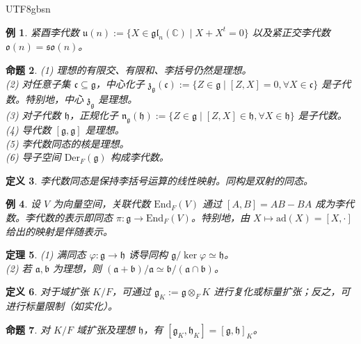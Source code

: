 \documentclass[11pt]{article}
\newtheorem{theorem}{定理}[section]
\newtheorem{proposition}[theorem]{命题}
\newtheorem{definition}[theorem]{定义}
\newtheorem{example}[theorem]{例}
\begin{document}
\begin{CJK*}{UTF8}{gbsn}
\begin{example}
紧酉李代数 $\mathfrak{u}(n) := \{X \in \mathfrak{gl}_n(\mathbb{C}) \mid X + X^t = 0\}$ 以及紧正交李代数 $\mathfrak{o}(n) = \mathfrak{so}(n)$。
\end{example}

\begin{proposition}
(1) 理想的有限交、有限和、李括号仍然是理想。\\
(2) 对任意子集 $\mathfrak{c} \subseteq \mathfrak{g}$，中心化子 $\mathfrak{z}_{\mathfrak{g}}(\mathfrak{c}) := \{Z \in \mathfrak{g} \mid [Z, X] = 0, \forall X \in \mathfrak{c}\}$ 是子代数。特别地，中心 $\mathfrak{z}_{\mathfrak{g}}$ 是理想。\\
(3) 对子代数 $\mathfrak{h}$，正规化子 $\mathfrak{n}_{\mathfrak{g}}(\mathfrak{h}) := \{Z \in \mathfrak{g} \mid [Z, X] \in \mathfrak{h}, \forall X \in \mathfrak{h}\}$ 是子代数。\\
(4) 导代数 $[\mathfrak{g}, \mathfrak{g}]$ 是理想。\\
(5) 李代数同态的核是理想。\\
(6) 导子空间 $\mathrm{Der}_F(\mathfrak{g})$ 构成李代数。
\end{proposition}

\begin{definition}
李代数同态是保持李括号运算的线性映射。同构是双射的同态。
\end{definition}

\begin{example}
设 $V$ 为向量空间，关联代数 $\mathrm{End}_F(V)$ 通过 $[A, B] = AB - BA$ 成为李代数。李代数的表示即同态 $\pi: \mathfrak{g} \to \mathrm{End}_F(V)$。特别地，由 $X \mapsto \mathrm{ad}(X) = [X, \cdot]$ 给出的映射是伴随表示。
\end{example}

\begin{theorem}
(1) 满同态 $\varphi: \mathfrak{g} \to \mathfrak{h}$ 诱导同构 $\mathfrak{g}/\ker \varphi \simeq \mathfrak{h}$。\\
(2) 若 $\mathfrak{a}, \mathfrak{b}$ 为理想，则 $(\mathfrak{a}+\mathfrak{b})/\mathfrak{a} \simeq \mathfrak{b}/(\mathfrak{a}\cap\mathfrak{b})$。
\end{theorem}

\begin{definition}
对于域扩张 $K/F$，可通过 $\mathfrak{g}_K := \mathfrak{g} \otimes_F K$ 进行复化或标量扩张；反之，可进行标量限制（如实化）。
\end{definition}

\begin{proposition}
对 $K/F$ 域扩张及理想 $\mathfrak{h}$，有 $[\mathfrak{g}_K, \mathfrak{h}_K] = [\mathfrak{g}, \mathfrak{h}]_K$。
\end{proposition}


\end{CJK*}
\end{document}
